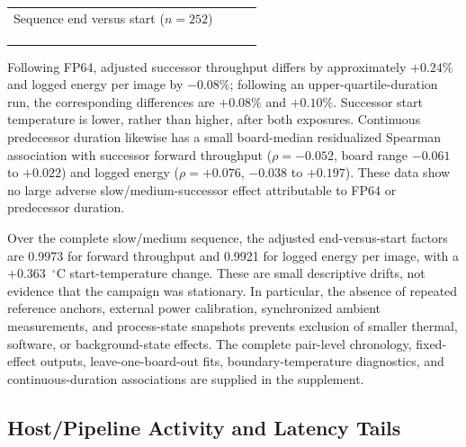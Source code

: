 \documentclass[electronics,article,submit,pdftex,moreauthors]{Definitions/mdpi}
\begin{document}
\begin{table}[t]
\begin{tabularx}{\textwidth}{>{\raggedright\arraybackslash}p{43mm}>{\centering\arraybackslash}X>{\centering\arraybackslash}X>{\centering\arraybackslash}X}
Sequence end versus start ($n=252$) & \shortstack{$\PrimaryForwardDriftEndStartRatio{}$\\{[$\PrimaryForwardDriftEndStartRatioLoboMinimum{}$, $\PrimaryForwardDriftEndStartRatioLoboMaximum{}$]}} & \shortstack{$\PrimaryEnergyDriftEndStartRatio{}$\\{[$\PrimaryEnergyDriftEndStartRatioLoboMinimum{}$, $\PrimaryEnergyDriftEndStartRatioLoboMaximum{}$]}} & \shortstack{$+\PrimaryStartTemperatureDriftEndStartDeltaC{}$\\{[$\PrimaryStartTemperatureDriftEndStartDeltaCLoboMinimum{}$, $+\PrimaryStartTemperatureDriftEndStartDeltaCLoboMaximum{}$]}} \\
\bottomrule
\end{tabularx}
\end{table}

Following FP64, adjusted successor throughput differs by approximately $+0.24\%$ and logged energy per image by $-0.08\%$; following an upper-quartile-duration run, the corresponding differences are $+0.08\%$ and $+0.10\%$. Successor start temperature is lower, rather than higher, after both exposures. Continuous predecessor duration likewise has a small board-median residualized Spearman association with successor forward throughput ($\rho=-0.052$, board range $-0.061$ to $+0.022$) and logged energy ($\rho=+0.076$, $-0.038$ to $+0.197$). These data show no large adverse slow/medium-successor effect attributable to FP64 or predecessor duration.

Over the complete slow/medium sequence, the adjusted end-versus-start factors are 0.9973 for forward throughput and 0.9921 for logged energy per image, with a +0.363~$^\circ$C start-temperature change. These are small descriptive drifts, not evidence that the campaign was stationary. In particular, the absence of repeated reference anchors, external power calibration, synchronized ambient measurements, and process-state snapshots prevents exclusion of smaller thermal, software, or background-state effects. The complete pair-level chronology, fixed-effect outputs, leave-one-board-out fits, boundary-temperature diagnostics, and continuous-duration associations are supplied in the supplement.

\subsection{Host/Pipeline Activity and Latency Tails}
\end{document}

